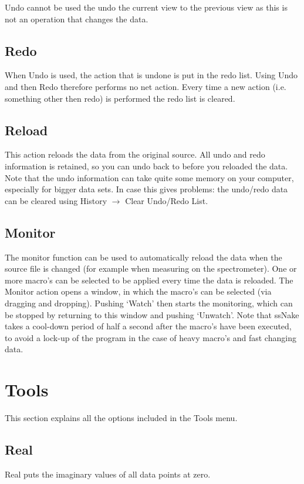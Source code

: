 \documentclass[11pt,a4paper]{article}
\begin{document}
Undo cannot be used the undo the current view to the previous view as this is not an operation that changes the data.

\subsection{Redo}
When Undo is used, the action that is undone is put in the redo list. Using Undo and then Redo therefore performs no net action. Every time a new action (i.e. something other then redo) is performed the redo list is cleared.

\subsection{Reload}
This action reloads the data from the original source. All undo and redo information is retained, so you can undo back to before you reloaded the data. Note that the undo information can take quite some memory on your computer, especially for bigger data sets. In case this gives problems: the undo/redo data can be cleared using History $\rightarrow$ Clear Undo/Redo List.

\subsection{Monitor}
The monitor function can be used to automatically reload the data when the source file is changed (for example when measuring on the spectrometer). One or more macro's can be selected to be applied every time the data is reloaded. The Monitor action opens a window, in which the macro's can be selected (via dragging and dropping). Pushing `Watch' then starts the monitoring, which can be stopped by returning to this window and pushing `Unwatch'. Note that ssNake takes a cool-down period of half a second after the macro's have been executed, to avoid a lock-up of the program in the case of heavy macro's and fast changing data.


\section{Tools}
This section explains all the options included in the Tools menu. 

\subsection{Real}
Real puts the imaginary values of all data points at zero.
\end{document}
